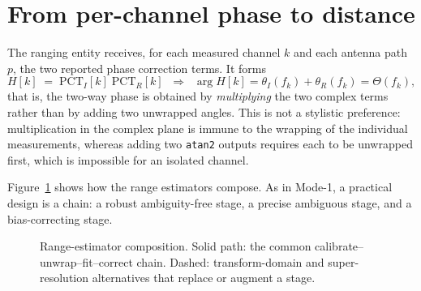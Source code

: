 \documentclass[11pt,a4paper]{article}
\newcommand{\PCT}{\mathrm{PCT}}
\newcommand{\code}[1]{\texttt{\small #1}}
\begin{document}
\section{From per-channel phase to distance}
\label{sec:range}

The ranging entity receives, for each measured channel $k$ and each antenna path $p$, the two
reported phase correction terms. It forms
\begin{equation}
H[k] \;=\; \PCT_I[k]\;\PCT_R[k] \;\;\Longrightarrow\;\;
\arg H[k] = \theta_I(f_k)+\theta_R(f_k) = \Theta(f_k),
\label{eq:formH}
\end{equation}
that is, the two-way phase is obtained by \emph{multiplying} the two complex terms rather than by
adding two unwrapped angles. This is not a stylistic preference: multiplication in the complex plane
is immune to the wrapping of the individual measurements, whereas adding two \code{atan2} outputs
requires each to be unwrapped first, which is impossible for an isolated channel.

Figure~\ref{fig:estchain} shows how the range estimators compose. As in Mode-1, a practical design is
a chain: a robust ambiguity-free stage, a precise ambiguous stage, and a bias-correcting stage.

\begin{figure}[h]
\centering
{}
\caption{Range-estimator composition. Solid path: the common calibrate--unwrap--fit--correct chain.
Dashed: transform-domain and super-resolution alternatives that replace or augment a stage.}
\label{fig:estchain}
\end{figure}
\end{document}
